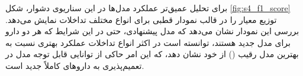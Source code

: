 \begin{table}[t]
	\caption{مقایسه نتایج مدل پیشنهادی با سایر مدل‌ها در سناریوی سوم}
	\label{table:scenario4_results}
	\centering %
	\renewcommand{\arraystretch}{2.5} 
\end{table}

برای تحلیل عمیق‌تر عملکرد مدل‌ها در این سناریوی دشوار، شکل \ref{fig:s4_f1_score} توزیع معیار  را در قالب نمودار قطبی برای انواع مختلف تداخلات نمایش می‌دهد. بررسی این نمودار نشان می‌دهد که مدل پیشنهادی، حتی در این شرایط که هر دو دارو برای مدل جدید هستند، توانسته است در اکثر انواع تداخلات عملکرد بهتری نسبت به بهترین مدل رقیب () از خود نشان دهد، که این امر حاکی از توانایی قابل توجه مدل در تعمیم‌پذیری به داروهای کاملاً جدید است.


